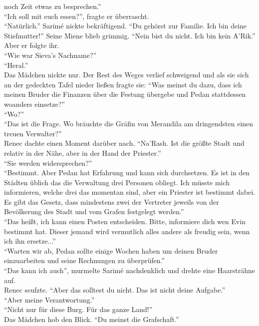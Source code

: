 noch Zeit etwas zu besprechen.''\\
``Ich soll mit euch essen?'', fragte er überrascht.\\
``Natürlich.'' Sarimé nickte bekräftigend. ``Du gehörst zur Familie. Ich bin deine Stiefmutter!''
Seine Miene blieb grimmig. ``Nein bist du nicht. Ich bin kein A'Rik.''\\
Aber er folgte ihr.\\
``Wie war Sieva's Nachname?''\\
``Heral.''\\
Das Mädchen nickte nur. Der Rest des Weges verlief schweigend und als sie sich an der gedeckten 
Tafel nieder ließen fragte sie: ``Was meinst du dazu, dass ich meinen Bruder die Finanzen über die 
Festung übergebe und Pedan stattdessen woanders einsetze?''\\
``Wo?''\\
``Das ist die Frage. Wo bräuchte die Gräfin von Merandila am dringendsten einen treuen 
Verwalter?''\\
Renec dachte einen Moment darüber nach. ``Na'Rash. Ist die größte Stadt und relativ in der Nähe, 
aber in der Hand der Priester.''\\
``Sie werden widersprechen?'' \\
``Bestimmt. Aber Pedan hat Erfahrung und kann sich durchsetzen. Es ist in den Städten üblich das 
die Verwaltung drei Personen obliegt. Ich müsste mich informieren, welche drei das momentan sind, 
aber ein Priester ist bestimmt dabei. Es gibt das Gesetz, dass mindestens zwei der Vertreter 
jeweils von der Bevölkerung des Stadt und vom Grafen festgelegt werden.''\\
``Das heißt, ich kann einen Posten entscheiden. Bitte, informiere dich wen Evin bestimmt hat. 
Dieser jemand wird vermutlich alles andere als freudig sein, wenn ich ihn ersetze...''\\
``Warten wir ab, Pedan sollte einige Wochen haben um deinen Bruder einzuarbeiten und seine 
Rechnungen zu überprüfen.''\\
``Das kann ich auch'', murmelte Sarimé nachdenklich und drehte eine Haarsträhne auf.\\
Renec seufzte. ``Aber das solltest du nicht. Das ist nicht deine Aufgabe.''\\
``Aber meine Verantwortung.''\\
``Nicht nur für diese Burg. Für das ganze Land!''\\
Das Mädchen hob den Blick. ``Du meinst die Grafschaft.''\\
